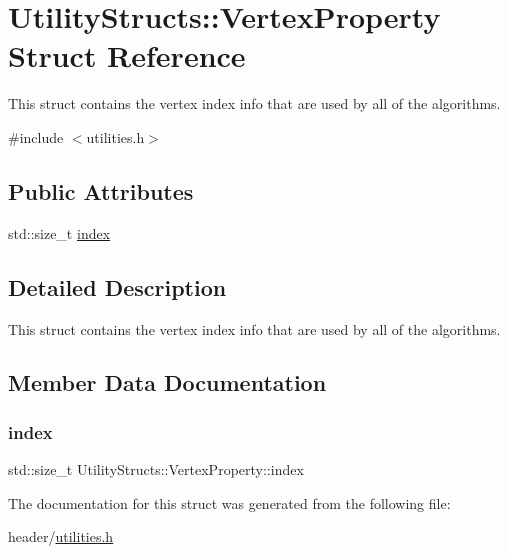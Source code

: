 \hypertarget{struct_utility_structs_1_1_vertex_property}{}\section{Utility\+Structs\+:\+:Vertex\+Property Struct Reference}
\label{struct_utility_structs_1_1_vertex_property}


This struct contains the vertex index info that are used by all of the algorithms.  




{\ttfamily \#include $<$utilities.\+h$>$}

\subsection*{Public Attributes}
\begin{DoxyCompactItemize}
\item 
std\+::size\+\_\+t \hyperlink{struct_utility_structs_1_1_vertex_property_a636cb729438e999aa3d9a17ac39d8641}{index}
\end{DoxyCompactItemize}


\subsection{Detailed Description}
This struct contains the vertex index info that are used by all of the algorithms. 

\subsection{Member Data Documentation}
\mbox{\label{struct_utility_structs_1_1_vertex_property_a636cb729438e999aa3d9a17ac39d8641}} 
\subsubsection{\texorpdfstring{index}{index}}
{\footnotesize\ttfamily std\+::size\+\_\+t Utility\+Structs\+::\+Vertex\+Property\+::index}



The documentation for this struct was generated from the following file\+:\begin{DoxyCompactItemize}
\item 
header/\hyperlink{utilities_8h}{utilities.\+h}\end{DoxyCompactItemize}
